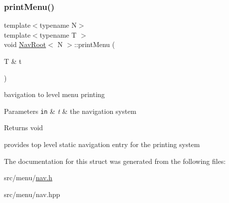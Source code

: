 \subsubsection{\texorpdfstring{print\+Menu()}{printMenu()}}
{\footnotesize\ttfamily template$<$typename N$>$ \\
template$<$typename T $>$ \\
void \hyperlink{structNavRoot}{Nav\+Root}$<$ N $>$\+::print\+Menu (\begin{DoxyParamCaption}\item[{T \&}]{t }\end{DoxyParamCaption})\hspace{0.3cm}{\ttfamily [inline]}}



bavigation to level menu printing 


\begin{DoxyParams}[1]{Parameters}
\mbox{\tt in}  & {\em t} & the navigation system \\
\hline
\end{DoxyParams}
\begin{DoxyReturn}{Returns}
void
\end{DoxyReturn}
provides top level static navigation entry for the printing system 

The documentation for this struct was generated from the following files\+:\begin{DoxyCompactItemize}
\item 
src/menu/\hyperlink{nav_8h}{nav.\+h}\item 
src/menu/nav.\+hpp\end{DoxyCompactItemize}
